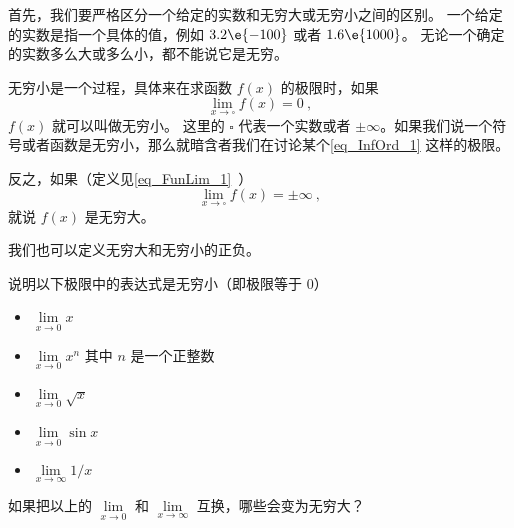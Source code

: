 

首先，我们要严格区分一个给定的实数和无穷大或无穷小之间的区别。 一个给定的实数是指一个具体的值，例如 $3.2\e{-100}$ 或者 $1.6\e{1000}$。 无论一个确定的实数多么大或多么小，都不能说它是无穷。

无穷小是一个过程，具体来在求函数 $f(x)$ 的极限时，如果
\begin{equation}\label{eq_InfOrd_1}
\lim_{x\to \square} f(x) = 0~,
\end{equation}
$f(x)$ 就可以叫做无穷小。 这里的 $\square$ 代表一个实数或者 $\pm\infty$。如果我们说一个符号或者函数是无穷小，那么就暗含者我们在讨论某个\autoref{eq_InfOrd_1} 这样的极限。

反之，如果（定义见\autoref{eq_FunLim_1}~）
\begin{equation}
\lim_{x\to \square} f(x) = \pm\infty~,
\end{equation}
就说 $f(x)$ 是无穷大。

我们也可以定义无穷大和无穷小的正负。

\begin{exercise}{}
说明以下极限中的表达式是无穷小（即极限等于 0）
\begin{itemize}
\item $\lim\limits_{x\to 0} x$
\item $\lim\limits_{x\to 0} x^n$ 其中 $n$ 是一个正整数
\item $\lim\limits_{x\to 0} \sqrt{x}$
\item $\lim\limits_{x\to 0} \sin x$
\item $\lim\limits_{x\to \infty} 1/x$
\end{itemize}
如果把以上的 $\lim\limits_{x\to 0}$ 和 $\lim\limits_{x\to \infty}$ 互换，哪些会变为无穷大？
\end{exercise}